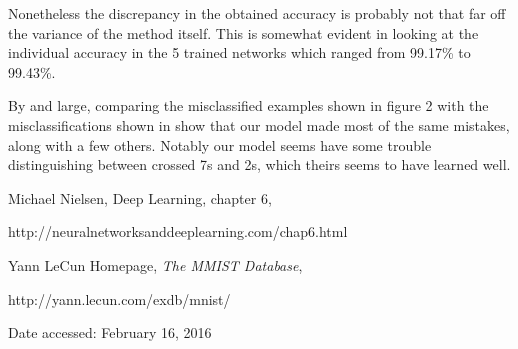 \documentclass[a4paper,12pt]{article}
\begin{document}
Nonetheless the discrepancy in the obtained accuracy is probably not that far off the variance of the method itself. This is somewhat evident in looking at the individual accuracy in the 5 trained networks which ranged from 99.17\% to 99.43\%.

By and large, comparing the misclassified examples shown in figure 2 with the misclassifications shown in \cite{SRC} show that our model made most of the same mistakes, along with a few others. Notably our model seems have some trouble distinguishing between crossed 7s and 2s, which theirs seems to have learned well. 


\begin{thebibliography}{10}

Michael Nielsen, Deep Learning, chapter 6,

http://neuralnetworksanddeeplearning.com/chap6.html

Yann LeCun Homepage, \textit{The MMIST Database},

http://yann.lecun.com/exdb/mnist/

Date accessed: February 16, 2016




\end{thebibliography}
\end{document}
